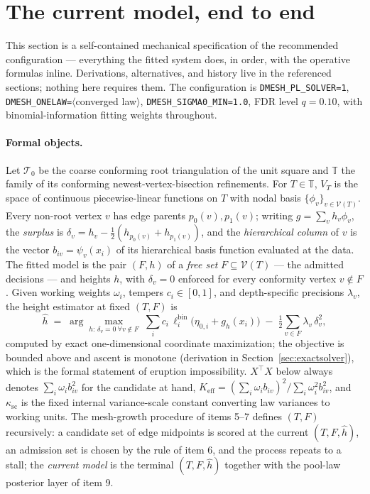 \documentclass[11pt]{article}
\begin{document}
\section{The current model, end to end}\label{sec:current}

This section is a self-contained mechanical specification of the recommended
configuration --- everything the fitted system does, in order, with the operative
formulas inline. Derivations, alternatives, and history live in the referenced
sections; nothing here requires them. The configuration is
\texttt{DMESH\_PL\_SOLVER=1},
\texttt{DMESH\_ONELAW=}$\langle$converged law$\rangle$,
\texttt{DMESH\_SIGMA0\_MIN=1.0}, FDR level $q=0.10$, with binomial-information
fitting weights throughout.

\paragraph{Formal objects.} Let $\mathcal{T}_0$ be the coarse conforming root
triangulation of the unit square and $\mathbb{T}$ the family of its conforming
newest-vertex-bisection refinements. For $T\in\mathbb{T}$, $V_T$ is the space of
continuous piecewise-linear functions on $T$ with nodal basis
$\{\phi_v\}_{v\in\mathcal{V}(T)}$. Every non-root vertex $v$ has edge parents
$p_0(v),p_1(v)$; writing $g=\sum_v h_v\phi_v$, the \emph{surplus} is
$\delta_v=h_v-\tfrac12(h_{p_0(v)}+h_{p_1(v)})$, and the \emph{hierarchical column}
of $v$ is the vector $b_{iv}=\psi_v(x_i)$ of its hierarchical basis function
evaluated at the data. The fitted model is the pair $(F,h)$ of a \emph{free set}
$F\subseteq\mathcal{V}(T)$ --- the admitted decisions --- and heights $h$, with
$\delta_v=0$ enforced for every conformity vertex $v\notin F$. Given working
weights $\omega_i$, tempers $c_i\in[0,1]$, and depth-specific precisions
$\lambda_v$, the height estimator at fixed $(T,F)$ is
\[
\hat h \;=\; \arg\max_{h:\,\delta_v=0\ \forall v\notin F}\;
\sum_i c_i\,\ell^{\mathrm{bin}}_i\bigl(\eta_{0,i}+g_h(x_i)\bigr)
\;-\;\tfrac12\sum_{v\in F}\lambda_v\,\delta_v^2 ,
\]
computed by exact one-dimensional coordinate maximization; the objective is
bounded above and ascent is monotone (derivation in
Section~\ref{sec:exactsolver}), which is the formal statement of eruption
impossibility. $X^\top X$ below always denotes $\sum_i\omega_i b_{iv}^2$ for the
candidate at hand, $K_{\mathrm{eff}}=(\sum_i\omega_i b_{iv})^2/\sum_i\omega_i^2
b_{iv}^2$, and $\kappa_{\mathrm{sc}}$ is the fixed internal variance-scale
constant converting law variances to working units. The mesh-growth procedure of
items 5--7 defines $(T,F)$ recursively: a candidate set of edge midpoints is
scored at the current $(T,F,\hat h)$, an admission set is chosen by the rule of
item 6, and the process repeats to a stall; the \emph{current model} is the
terminal $(T,F,\hat h)$ together with the pool-law posterior layer of item 9.
\end{document}
